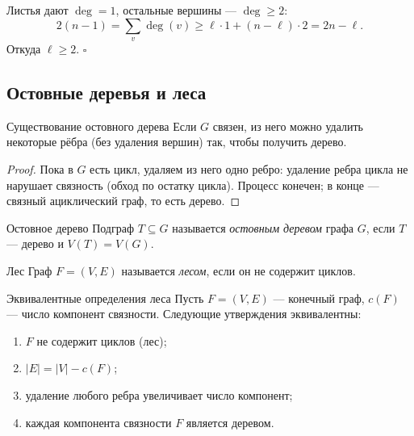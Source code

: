 \medskip\noindent
Листья дают $\deg = 1$, остальные вершины — $\deg \ge 2$:
\[
  2(n-1) = \sum_{v}\deg(v) \ge \ell\cdot 1 + (n-\ell)\cdot 2 = 2n - \ell.
\]
Откуда $\ell \ge 2$. $\square$

\subsection{Остовные деревья и леса}

\begin{Theorem}{Существование остовного дерева}{}
  Если $G$ связен, из него можно удалить некоторые рёбра (без удаления вершин)
  так, чтобы получить дерево.
\end{Theorem}

\begin{proof}
  Пока в $G$ есть цикл, удаляем из него одно ребро:
  удаление ребра цикла не нарушает связность (обход по остатку цикла).
  Процесс конечен; в конце — связный ациклический граф, то есть дерево.
\end{proof}

\begin{Definition}{Остовное дерево}{}
  Подграф $T \subseteq G$ называется \emph{остовным деревом} графа $G$,
  если $T$ — дерево и $V(T)=V(G)$.
\end{Definition}

\begin{Definition}{Лес}{}
  Граф $F=(V,E)$ называется \emph{лесом}, если он не содержит циклов.
\end{Definition}

\begin{Statement}{Эквивалентные определения леса}{}
  Пусть $F=(V,E)$ — конечный граф, $c(F)$ — число компонент связности.
  Следующие утверждения эквивалентны:
  \begin{enumerate}
    \item[(i)]   $F$ не содержит циклов (лес);
    \item[(ii)]  $|E| = |V| - c(F)$;
    \item[(iii)] удаление любого ребра увеличивает число компонент;
    \item[(iv)]  каждая компонента связности $F$ является деревом.
  \end{enumerate}
\end{Statement}

